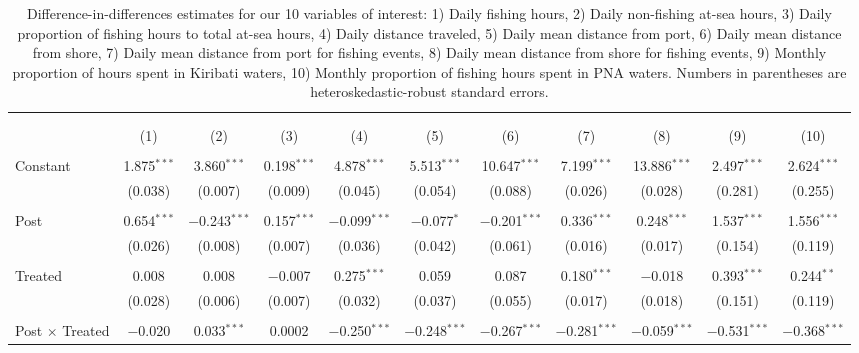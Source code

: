 
\begin{table}[H] \centering 
  \caption{\label{tab:DID_without_CHN}Difference-in-differences estimates for our 10 variables of interest: 1) Daily fishing hours, 2) Daily non-fishing at-sea hours, 3) Daily proportion of fishing hours to total at-sea hours, 4) Daily distance traveled, 5) Daily mean distance from port, 6) Daily mean distance from shore, 7) Daily mean distance from port for fishing events, 8) Daily mean distance from shore for fishing events, 9) Monthly proportion of hours spent in Kiribati waters, 10) Monthly proportion of fishing hours spent in PNA waters. Numbers in parentheses are heteroskedastic-robust standard errors.} 
  \label{} 
\footnotesize 
\begin{tabular}{@{\extracolsep{1pt}}lcccccccccc} 
\\[-1.8ex]\hline 
\hline \\[-1.8ex] 
\\[-1.8ex] & (1) & (2) & (3) & (4) & (5) & (6) & (7) & (8) & (9) & (10)\\ 
\hline \\[-1.8ex] 
 Constant & 1.875$^{***}$ & 3.860$^{***}$ & 0.198$^{***}$ & 4.878$^{***}$ & 5.513$^{***}$ & 10.647$^{***}$ & 7.199$^{***}$ & 13.886$^{***}$ & 2.497$^{***}$ & 2.624$^{***}$ \\ 
  & (0.038) & (0.007) & (0.009) & (0.045) & (0.054) & (0.088) & (0.026) & (0.028) & (0.281) & (0.255) \\ 
  & & & & & & & & & & \\ 
 Post & 0.654$^{***}$ & $-$0.243$^{***}$ & 0.157$^{***}$ & $-$0.099$^{***}$ & $-$0.077$^{*}$ & $-$0.201$^{***}$ & 0.336$^{***}$ & 0.248$^{***}$ & 1.537$^{***}$ & 1.556$^{***}$ \\ 
  & (0.026) & (0.008) & (0.007) & (0.036) & (0.042) & (0.061) & (0.016) & (0.017) & (0.154) & (0.119) \\ 
  & & & & & & & & & & \\ 
 Treated & 0.008 & 0.008 & $-$0.007 & 0.275$^{***}$ & 0.059 & 0.087 & 0.180$^{***}$ & $-$0.018 & 0.393$^{***}$ & 0.244$^{**}$ \\ 
  & (0.028) & (0.006) & (0.007) & (0.032) & (0.037) & (0.055) & (0.017) & (0.018) & (0.151) & (0.119) \\ 
  & & & & & & & & & & \\ 
 Post $\times$ Treated & $-$0.020 & 0.033$^{***}$ & 0.0002 & $-$0.250$^{***}$ & $-$0.248$^{***}$ & $-$0.267$^{***}$ & $-$0.281$^{***}$ & $-$0.059$^{***}$ & $-$0.531$^{***}$ & $-$0.368$^{***}$ \\ 

\end{tabular}
\end{table}
